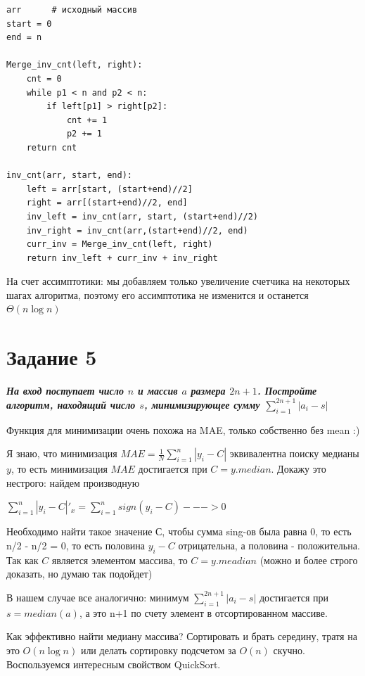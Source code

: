 \documentclass{article}
\begin{document}
\begin{verbatim}
arr      # исходный массив
start = 0
end = n

Merge_inv_cnt(left, right):
    cnt = 0
    while p1 < n and p2 < n:
        if left[p1] > right[p2]:
            cnt += 1
            p2 += 1
    return cnt

inv_cnt(arr, start, end):
    left = arr[start, (start+end)//2]
    right = arr[(start+end)//2, end]
    inv_left = inv_cnt(arr, start, (start+end)//2)
    inv_right = inv_cnt(arr,(start+end)//2, end)
    curr_inv = Merge_inv_cnt(left, right)
    return inv_left + curr_inv + inv_right

\end{verbatim}

На счет ассимптотики: мы добавляем только увеличение счетчика на некоторых шагах алгоритма, поэтому его ассимптотика не изменится и останется $\Theta(n\log n)$


\section*{\textbf{Задание 5}}  \textbf{\textit{На вход поступает число $n$ и массив $a$ размера $2n + 1$. Постройте алгоритм, находящий число $s$, минимизирующее сумму $\sum\limits_{i=1}^{2n+1} |a_i - s|$}}

Функция для минимизации очень похожа на MAE, только собственно без mean :)

Я знаю, что минимизация  $MAE = \frac{1}{N}\sum\limits_{i=1}^{n} |y_i - C|$ эквивалентна поиску медианы $y$, то есть минимизация $MAE$ достигается при $C = y.median$. Докажу это нестрого: найдем производную 

$\sum\limits_{i=1}^{n} |y_i - C| '_x = \sum\limits_{i=1}^{n} sign(y_i - C) ---> 0$

Необходимо найти такое значение С, чтобы сумма sing-ов была равна 0, то есть n/2 - n/2 = 0, то есть половина $y_i - C$ отрицательна, а половина - положительна. Так как $C$ является элементом массива, то $C = y.meadian$ (можно и более строго доказать, но думаю так подойдет)

В нашем случае все аналогично: минимум $\sum\limits_{i=1}^{2n+1} |a_i - s|$ достигается при $s = median(a)$, а это n+1 по счету элемент в отсортированном массиве.  

Как эффективно найти медиану массива? Сортировать и брать середину, тратя на это $O(n\log n)$ или делать сортировку подсчетом за $O(n)$ скучно. Воспользуемся интересным свойством QuickSort.
\end{document}
